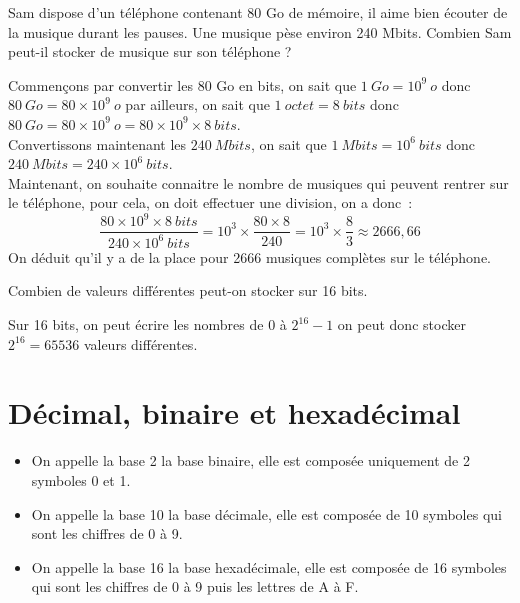 \documentclass[a4paper, noanswers, addpoints, 12pt]{exam}
\begin{document}
\begin{questions}
\question[1] Sam dispose d'un téléphone contenant 80 Go de mémoire, il aime bien écouter de la musique durant les pauses.
Une musique pèse environ 240 Mbits. Combien Sam peut-il stocker de musique sur son téléphone ?
\begin{solution}[5\bigskipamount]
     Commençons par convertir les 80 Go en bits, on sait que  $1\ Go = 10^9\ o$ donc $80\ Go = 80 \times 10^9\ o$ par ailleurs, on sait que $1\ octet = 8\ bits $ donc $80\ Go = 80 \times 10^9\ o = 80 \times 10^9 \times 8\ bits$.\\

     Convertissons maintenant les $240\ Mbits$, on sait que $1\ Mbits = 10^6\ bits$ donc $240\ Mbits = 240 \times 10^6\ bits$.\\

     Maintenant, on souhaite connaitre le nombre de musiques qui peuvent rentrer sur le téléphone, pour cela, on doit effectuer une division, on a donc\ :
     $$\frac{80 \times 10^9 \times 8\ bits}{240 \times 10^6\ bits} = 10^3 \times \frac{80 \times 8}{240} = 10^3 \times \frac{8}{3} \approx 2666{,}66$$  On déduit qu'il y a de la place pour 2666 musiques complètes sur le téléphone.
\end{solution}

\question[1] Combien de valeurs différentes peut-on stocker sur 16 bits.
\begin{solution}[5\bigskipamount]
     Sur 16 bits, on peut écrire les nombres de $0$ à $2^{16} - 1$ on peut donc stocker $2^{16} = 65536$ valeurs différentes.
\end{solution}

\section{Décimal, binaire et hexadécimal}

\begin{tcolorbox}[enhanced,
    colback=yellow!25!black!10!white,colframe=yellow!75!black,title=Rappel,
    drop fuzzy shadow,watermark color=white]
    \begin{itemize}
        \item On appelle la base 2 la base binaire, elle est composée uniquement de 2 symboles 0 et 1.
        \item On appelle la base 10 la base décimale, elle est composée de 10 symboles qui sont les chiffres de 0 à 9.
        \item On appelle la base 16 la base hexadécimale, elle est composée de 16 symboles qui sont les chiffres de 0 à 9 puis les lettres de A à F.
    \end{itemize}
\end{tcolorbox}


\end{questions}
\end{document}
